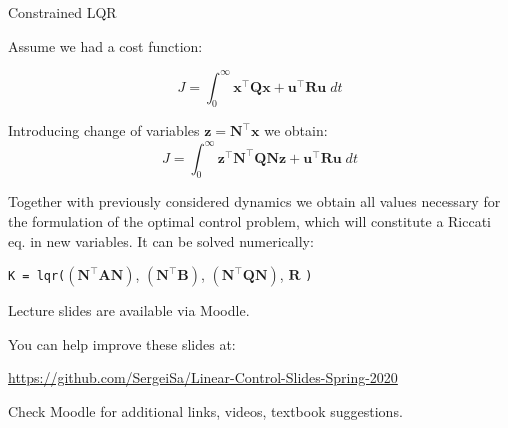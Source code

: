 \documentclass{beamer}
\begin{document}
\begin{frame}{Constrained LQR}
\begin{flushleft}

Assume we had a cost function:

\[
J = \int_0^\infty
\mathbf  x^\top \mathbf Q \mathbf x +
\mathbf  u^\top \mathbf R \mathbf u 
\; d t
\]

Introducing change of variables $\mathbf z = \mathbf N^\top \mathbf x$ we obtain:
\[
J = \int_0^\infty
\mathbf  z^\top \mathbf N^\top \mathbf Q \mathbf N \mathbf z +
\mathbf  u^\top \mathbf R \mathbf u 
\; d t
\]

Together with previously considered dynamics we obtain all values necessary for the formulation of the optimal control problem, which will constitute a Riccati eq. in new variables. It can be solved numerically:

\texttt{K = lqr(}$(\mathbf N^\top \mathbf A \mathbf N)$, 
$(\mathbf N^\top \mathbf B)$, 
$(\mathbf N^\top \mathbf Q \mathbf N)$, 
$\mathbf R$
\texttt{)}

\end{flushleft}
\end{frame}



\begin{frame}
\centerline{Lecture slides are available via Moodle.}
\bigskip
\centerline{You can help improve these slides at:}
\centerline{\url{https://github.com/SergeiSa/Linear-Control-Slides-Spring-2020}}
\bigskip
\centerline{Check Moodle for additional links, videos, textbook suggestions.}
\end{frame}
\end{document}
